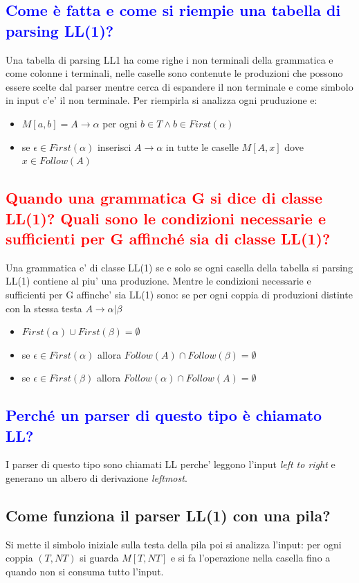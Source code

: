 \documentclass{article}
\begin{document}
\subsection{\textcolor{blue}{Come è fatta e come si riempie una tabella di parsing LL(1)?}}
Una tabella di parsing LL1 ha come righe i non terminali della grammatica e come colonne i terminali,
nelle caselle sono contenute le produzioni che possono essere scelte dal parser mentre cerca di espandere il
non terminale e come simbolo in input c'e' il non terminale.
Per riempirla si analizza ogni pruduzione e:
\begin{itemize}
    \item $M[a,b] = A \to \alpha$ per ogni $b \in T \land b \in First(\alpha)$
    \item se $\epsilon \in First(\alpha)$ inserisci $A \to \alpha$ in tutte le caselle
          $M[A,x]$ dove $x \in Follow(A)$
\end{itemize}

\subsection{\textcolor{red}{Quando una grammatica G si dice di classe LL(1)? Quali sono le condizioni necessarie e sufficienti per G affinché sia di classe LL(1)?}}
Una grammatica e' di classe LL(1) se e solo se ogni casella della tabella si parsing LL(1) contiene al piu' una produzione.
Mentre le condizioni necessarie e sufficienti per G affinche' sia LL(1) sono: se per ogni coppia di produzioni distinte con la stessa testa $A \to \alpha|\beta$
\begin{itemize}
    \item $First(\alpha) \cup First(\beta) = \emptyset$
    \item se $\epsilon \in First(\alpha)$ allora $Follow(A) \cap Follow(\beta) =
              \emptyset$
    \item se $\epsilon \in First(\beta)$ allora $Follow(\alpha) \cap Follow(A) =
              \emptyset$
\end{itemize}

\subsection{\textcolor{blue}{Perché un parser di questo tipo è chiamato LL?}}
I parser di questo tipo sono chiamati LL perche' leggono l'input \textit{left
    to right} e generano un albero di derivazione \textit{leftmost}.
\subsection{Come funziona il parser LL(1) con una pila?}
Si mette il simbolo iniziale sulla testa della pila poi si analizza l'input:
per ogni coppia $(T,NT)$ si guarda $M[T,NT]$ e si fa l'operazione nella casella
fino a quando non si consuma tutto l'input.
\end{document}
